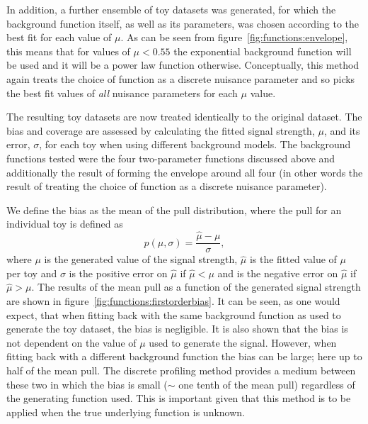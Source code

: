 In addition, a further ensemble of toy datasets was generated, for which the background function itself, as well 
as its parameters, was chosen according to the best fit for each value of $\mu$. As can be seen from 
figure~\ref{fig:functions:envelope}, this means that for values of $\mu < 0.55$ the exponential background 
function will be used and it will be a power law function otherwise.
Conceptually, this method again
treats the choice of function as a discrete nuisance parameter and so picks the
best fit values of {\em all\/} nuisance parameters for each $\mu$ value.

The resulting toy datasets are now treated identically to the original dataset. The bias and coverage are assessed by calculating the fitted signal strength, $\mu$, and its error, $\sigma$, for each toy when using different background models. The background functions tested were the four two-parameter functions discussed above and additionally the result of forming the envelope around all four (in other words the result of treating the choice of function as a discrete nuisance parameter). 

We define the bias as the mean of the pull distribution, where the pull for an individual toy is defined as
\begin{equation}
	p(\mu,\sigma) = \frac{\hat{\mu}-\mu}{\sigma},
\end{equation}
where $\mu$ is the generated value of the signal strength, $\hat{\mu}$ is the fitted value of $\mu$ per toy and $\sigma$ is the positive error on $\hat{\mu}$ if $\hat{\mu} < \mu$ and is the negative error on $\hat{\mu}$ if $\hat{\mu} > \mu$. The results of the mean pull as a function of the generated signal strength are shown in figure~\ref{fig:functions:firstorderbias}. It can be seen, as one would expect, that when fitting back with the same background function as used to generate the toy dataset, the bias is negligible. It is also shown that the bias is not dependent on the value of $\mu$ used to generate the signal. However, when fitting back with a different background function the bias can be large; here up to half of the mean pull. The discrete profiling method provides a medium between these two in which the bias is small ($\sim$ one tenth of the mean pull) regardless of the generating function used. This is important given that this method is to be applied when the true underlying function is unknown.

